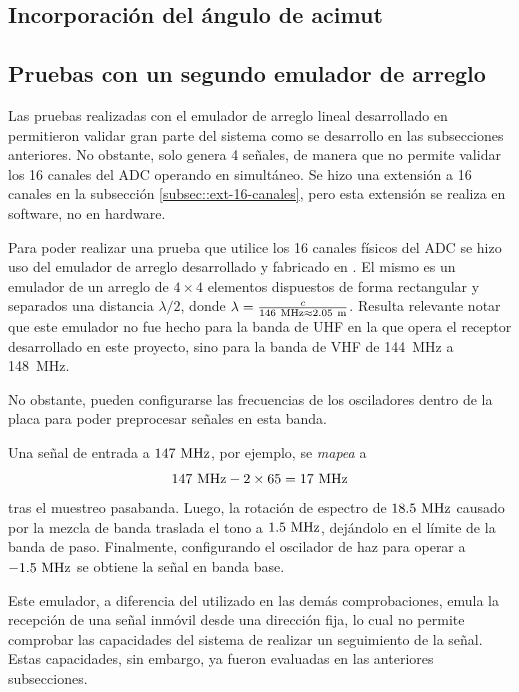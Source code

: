 \documentclass[../../main.tex]{subfiles}
\begin{document}
\subsection{Incorporación del ángulo de acimut}

\subsection{Pruebas con un segundo emulador de arreglo}
Las pruebas realizadas con el emulador de arreglo lineal desarrollado en \cite{proyecto-arce} permitieron validar gran parte del sistema como se desarrollo en las subsecciones anteriores. No obstante, solo genera 4 señales, de manera que no permite validar los 16 canales del ADC operando en simultáneo. Se hizo una extensión a 16 canales en la subsección \ref{subsec::ext-16-canales}, pero esta extensión se realiza en software, no en hardware.

Para poder realizar una prueba que utilice los 16 canales físicos del ADC se hizo uso del emulador de arreglo desarrollado y fabricado en \cite{proyecto-jose}. El mismo es un emulador de un arreglo de $4 \times 4$ elementos dispuestos de forma rectangular y separados una distancia $\lambda/2$, donde $\lambda = \frac{c}{146~\textrm{MHz} \approx 2.05~\textrm{m}}$. Resulta relevante notar que este emulador no fue hecho para la banda de UHF en la que opera el receptor desarrollado en este proyecto, sino para la banda de VHF de 144~MHz a 148~MHz.

No obstante, pueden configurarse las frecuencias de los osciladores dentro de la placa para poder preprocesar señales en esta banda.

Una señal de entrada a $147~\textrm{MHz}$, por ejemplo, se \textit{mapea} a \[147~\textrm{MHz} - 2 \times 65 = 17~\textrm{MHz}\] tras el muestreo pasabanda. Luego, la rotación de espectro de $18.5~\textrm{MHz}$ causado por la mezcla de banda traslada el tono a $1.5~\textrm{MHz}$, dejándolo en el límite de la banda de paso. Finalmente, configurando el oscilador de haz para operar a $-1.5~\textrm{MHz}$ se obtiene la señal en banda base.

Este emulador, a diferencia del utilizado en las demás comprobaciones, emula la recepción de una señal inmóvil desde una dirección fija, lo cual no permite comprobar las capacidades del sistema de realizar un seguimiento de la señal. Estas capacidades, sin embargo, ya fueron evaluadas en las anteriores subsecciones.

\end{document}
